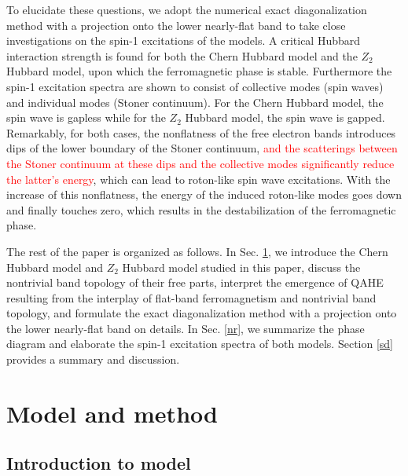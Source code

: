 \documentclass[amsmath,superscriptaddress,showpacs,aps,prb,twocolumn]{revtex4-1}
\begin{document}
\par To elucidate these questions, we adopt the numerical exact diagonalization method with a projection onto the lower nearly-flat band to take close investigations on the spin-1 excitations of the models. A critical Hubbard interaction strength is found for both the Chern Hubbard model and the $Z_2$ Hubbard model, upon which the ferromagnetic phase is stable. Furthermore the spin-1 excitation spectra are shown to consist of collective modes (spin waves) and individual modes (Stoner continuum). For the Chern Hubbard model, the spin wave is gapless while for the $Z_2$ Hubbard model, the spin wave is gapped. Remarkably, for both cases, the nonflatness of the free electron bands introduces dips of the lower boundary of the Stoner continuum, \textcolor{red}{and the scatterings between the Stoner continuum at these dips and the collective modes significantly reduce the latter's energy}, which can lead to roton-like spin wave excitations. With the increase of this nonflatness, the energy of the induced roton-like modes goes down and finally touches zero, which results in the destabilization of the ferromagnetic phase.

\par The rest of the paper is organized as follows. In Sec. \ref{mm}, we introduce the Chern Hubbard model and $Z_2$ Hubbard model studied in this paper, discuss the nontrivial band topology of their free parts, interpret the emergence of QAHE resulting from the interplay of flat-band ferromagnetism and nontrivial band topology, and formulate the exact diagonalization method with a projection onto the lower nearly-flat band on details. In Sec. \ref{nr}, we summarize the phase diagram and elaborate the spin-1 excitation spectra of both models. Section \ref{sd} provides a summary and discussion.

\section{Model and method}\label{mm}
\subsection{Introduction to model}\label{intro_to_model}
\end{document}
